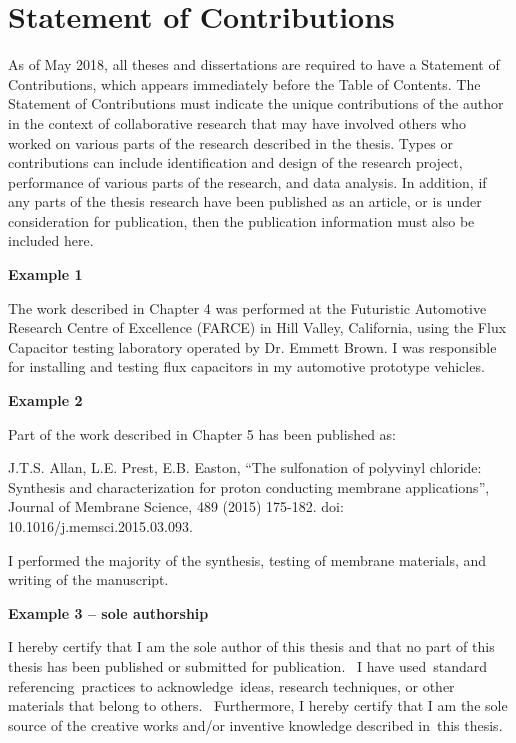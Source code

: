 \chapter*{Statement of Contributions}

As of May 2018, all theses and dissertations are required to have a Statement of Contributions, which appears immediately before the Table of Contents. The Statement of Contributions must indicate the unique contributions of the author in the context of collaborative research that may have involved others who worked on various parts of the research described in the thesis. Types or contributions can include identification and design of the research project, performance of various parts of the research, and data analysis. In addition, if any parts of the thesis research have been published as an article, or is under consideration for publication, then the publication information must also be included here. 

\textbf{Example 1}

The work described in Chapter 4 was performed at the Futuristic Automotive Research Centre of Excellence (FARCE) in Hill Valley, California, using the Flux Capacitor testing laboratory operated by Dr. Emmett Brown. I was responsible for installing and testing flux capacitors in my automotive prototype vehicles.

\textbf{Example 2}

Part of the work described in Chapter 5 has been published as:

J.T.S. Allan, L.E. Prest, E.B. Easton, “The sulfonation of polyvinyl chloride: Synthesis and characterization for proton conducting membrane applications”, Journal of Membrane Science, 489 (2015) 175-182. doi: 10.1016/j.memsci.2015.03.093. 

I performed the majority of the synthesis, testing of membrane materials, and writing of the manuscript. 

\textbf{Example 3 – sole authorship}

I hereby certify that I am the sole author of this thesis and that no part of this thesis has been published or submitted for publication.  I have used standard referencing practices to acknowledge ideas, research techniques, or other materials that belong to others.  Furthermore, I hereby certify that I am the sole source of the creative works and/or inventive knowledge described in this thesis.